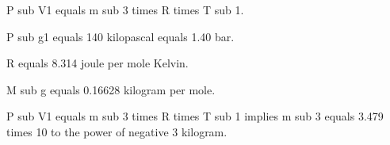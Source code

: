 P sub V1 equals m sub 3 times R times T sub 1.

P sub g1 equals 140 kilopascal equals 1.40 bar.

R equals 8.314 joule per mole Kelvin.

M sub g equals 0.16628 kilogram per mole.

P sub V1 equals m sub 3 times R times T sub 1 implies m sub 3 equals 3.479 times 10 to the power of negative 3 kilogram.